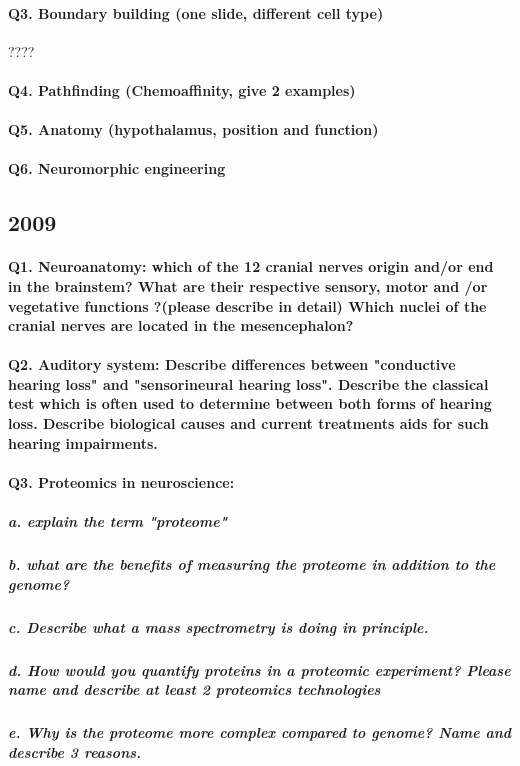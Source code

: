 \documentclass[12pt,article,oneside,a4paper]{memoir}
\begin{document}
\paragraph{Q3. Boundary building (one slide, different cell type)} ????
\paragraph{Q4. Pathfinding (Chemoaffinity, give 2 examples)}
\paragraph{Q5. Anatomy (hypothalamus, position and function)}
\paragraph{Q6. Neuromorphic engineering}

\subsection{2009}
\paragraph{Q1. Neuroanatomy: which of the 12 cranial nerves origin and/or end in the brainstem? What are their respective sensory, motor and /or vegetative functions ?(please describe in detail) Which nuclei of the cranial nerves are located in the mesencephalon?}
\paragraph{Q2. Auditory system: Describe differences between "conductive hearing loss" and "sensorineural hearing loss". Describe the classical test which is often used to determine between both forms of hearing loss. Describe biological causes and current treatments aids for such hearing impairments.}

\paragraph{Q3. Proteomics in neuroscience:}
\subparagraph{a. explain the term "proteome"}
\subparagraph{b. what are the benefits of measuring the proteome in addition to the genome?}
\subparagraph{c. Describe what a mass spectrometry is doing in principle.}
\subparagraph{d. How would you quantify proteins in a proteomic experiment? Please name and describe at least 2 proteomics technologies}
\subparagraph{e. Why is the proteome more complex compared to genome? Name and describe 3 reasons.}
\end{document}
